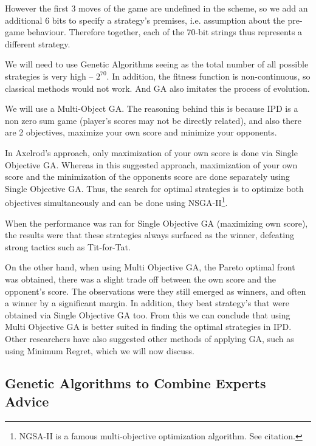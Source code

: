 \documentclass{icldt}
\numberwithin{equation}{section}       %
\begin{document}
However the first 3 moves of the game are undefined in the scheme, so we add an additional 6 bits to specify a strategy's premises, i.e. assumption about the pre-game behaviour. Therefore together, each of the 70-bit strings thus represents a different strategy.

We will need to use Genetic Algorithms seeing as the total number of all possible strategies is very high – \( 2^{70}\). In addition, the fitness function is non-continuous, so classical methods would not work. And GA also imitates the process of evolution.

We will use a Multi-Object GA. The reasoning behind this is because IPD is a non zero sum game (player's scores may not be directly related), and also there are 2 objectives, maximize your own score and minimize your opponents. 

In Axelrod's approach, only maximization of your own score is done via Single Objective GA. Whereas in this suggested approach, maximization of your own score and the minimization of the opponents score are done separately using Single Objective GA. Thus, the search for optimal strategies is to optimize both objectives simultaneously and can be done using NSGA-II\footnote{NGSA-II is a famous multi-objective optimization algorithm. See citation\cite{nsgaii}.}. \cite{nsgaii}

When the performance was ran for Single Objective GA (maximizing own score), the results were that these strategies always surfaced as the winner, defeating strong tactics such as Tit-for-Tat. 

On the other hand, when using Multi Objective GA, the Pareto optimal front was obtained, there was a slight trade off between the own score and the opponent's score. The observations were they still emerged as winners, and often a winner by a significant margin. In addition, they beat strategy's that were obtained via Single Objective GA too. From this we can conclude that using Multi Objective GA is better suited in finding the optimal strategies in IPD.\\

Other researchers have also suggested other methods of applying GA, such as using Minimum Regret, which we will now discuss.

\subsection{Genetic Algorithms to Combine Experts Advice}
\label{sect:Genetic Algorithms to Combine Experts Advice}
\end{document}
